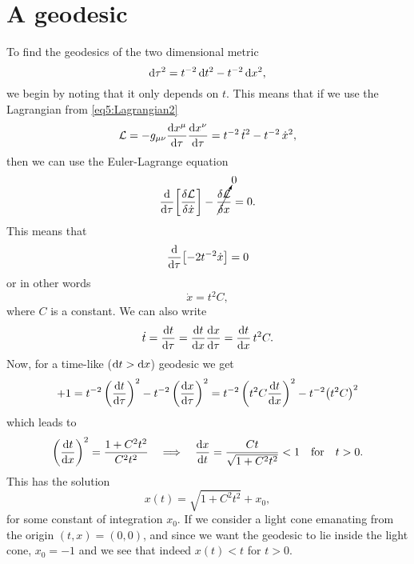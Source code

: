 \documentclass[11pt,a4paper, 
swedish, english %
]{article}
\begin{document}
\section{A geodesic}
To find the geodesics of the two dimensional metric
\begin{equation}
\mathrm{d}\tau^2=t^{-2}\,\mathrm{d}{t}^2 - t^{-2}\,\mathrm{d}{x}^2,
\end{equation}
we begin by noting that it only depends on $t$. This means that if we
use the Lagrangian from \eqref{eq5:Lagrangian2}
\begin{equation}
\mathcal{L}=-g_{\mu\nu}\dv{x^\mu}{\tau}\dv{x^\nu}{\tau}
=t^{-2}\,\dot{t}^2 - t^{-2}\,\dot{x}^2,
\end{equation}
then we can use the Euler-Lagrange equation
\begin{equation}
\dv{\tau}\qty[\frac{\delta\mathcal{L}}{\delta\dot{x}}]
-\cancelto{0}{\frac{\delta\mathcal{L}}{\delta{x}}}=0.
\end{equation}
This means that
\begin{equation}
\dv{\tau}\qty[-2t^{-2}\dot{x}]=0
\end{equation}
or in other words
\begin{equation}
\dot{x}=t^2C,
\end{equation}
where $C$ is a constant. We can also write
\begin{equation}
\dot{t}=\dv{t}{\tau}=\dv{t}{x}\dv{x}{\tau}
=\dv{t}{x}\,t^2C.
\end{equation}
Now, for a time-like ($\mathrm{d}{t}>\mathrm{d}{x}$) geodesic we get
\begin{equation}
+1=t^{-2}\,\qty(\dv{t}{\tau})^2
- t^{-2}\,\qty(\dv{x}{\tau})^2
=t^{-2}\,\qty(t^2C\dv{t}{x})^2
- t^{-2}\qty(t^2C)^2
\end{equation}
which leads to
\begin{equation}
\qty(\dv{t}{x})^2=\frac{1+C^2t^2}{C^2t^2}
\quad\Longrightarrow\quad
\dv{x}{t}=\frac{Ct}{\sqrt{1+C^2t^2}}<1\qfor t>0.
\end{equation}
This has the solution
\begin{equation}
x(t)=\sqrt{1+C^2t^2}+x_0,
\end{equation}
for some constant of integration $x_0$. If we consider a light cone
emanating from the origin $(t,x)=(0,0)$, and since we want the
geodesic to lie inside the light cone, $x_0=-1$ and we see that indeed
$x(t)<t$ for $t>0$.
\end{document}
